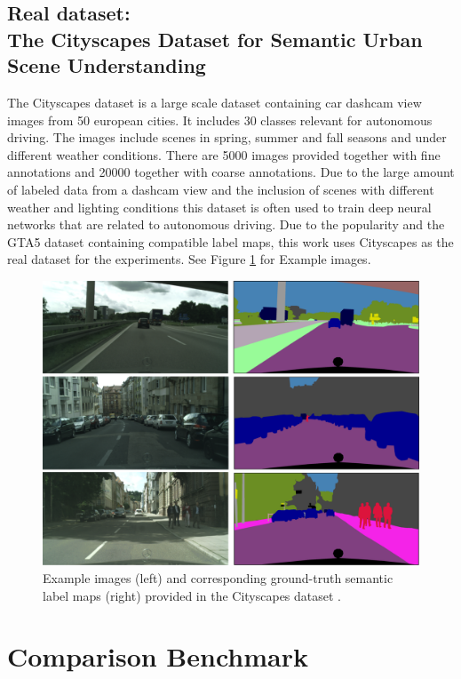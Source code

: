 \subsection{Real dataset:\\
	The Cityscapes Dataset for Semantic Urban Scene Understanding}

The Cityscapes dataset \cite{Cordts_2016_CVPR} is a large scale dataset containing car dashcam view images from 50 european cities. It includes 30 classes relevant for autonomous driving. The images include scenes in spring, summer and fall seasons and under different weather conditions. There are 5000 images provided together with fine annotations and 20000 together with coarse annotations. Due to the large amount of labeled data from a dashcam view and the inclusion of scenes with different weather and lighting conditions this dataset is often used to train deep neural networks that are related to autonomous driving. Due to the popularity and the GTA5 dataset containing compatible label maps, this work uses Cityscapes as the real dataset for the experiments. See Figure \ref{fig:cityscapes_examples} for Example images.

\begin{figure}
	\centering
	\includegraphics[width=\textwidth]{images/cityscapes_example.png}
	\caption{Example images (left) and corresponding ground-truth semantic label maps (right) provided in the Cityscapes dataset \cite{Cordts_2016_CVPR}.}
	\label{fig:cityscapes_examples}
\end{figure}

\section{Comparison Benchmark}
